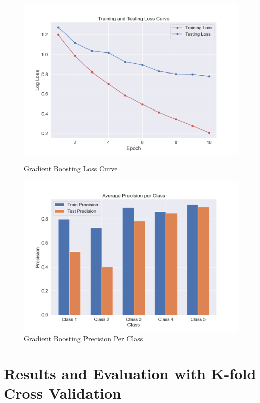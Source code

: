 \begin{figure}[H]
	\vspace{1em}
	
	\begin{minipage}[b]{0.45\textwidth}
		\centering
		\includegraphics[width=\textwidth]{img/paper_1//loss_curve.png}
		\caption{Gradient Boosting Loss Curve}
	\end{minipage}
	\hfill
	\begin{minipage}[b]{0.45\textwidth}
		\centering
		\includegraphics[width=\textwidth]{img/paper_1//precision_per_class.png}
		\caption{Gradient Boosting Precision Per Class}
	\end{minipage}
\end{figure}

\section{Results and Evaluation with K-fold Cross Validation }

